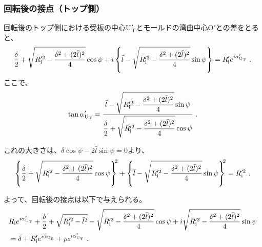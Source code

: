 \subsubsection{回転後の接点（トップ側）}
回転後のトップ側における受板の中心U$_\text T'$とモールドの湾曲中心O$'$との差をとると、
\begin{align*}
  \frac\delta2+\sqrt{R_\text i'^2-\frac{\delta^2+(2\bar l)^2}4}\cos\psi
  +i\left\{\bar l-\sqrt{R_\text i'^2-\frac{\delta^2+(2\bar l)^2}4}\sin\psi\right\}
  = R_\text i'e^{i\alpha'_{\text U_\text T}}\ .
\end{align*}
ここで、
\begin{align*}
  \tan\alpha'_{\text U_\text T}
  = \frac{\displaystyle\bar l-\sqrt{R_\text i'^2-\frac{\delta^2+(2\bar l)^2}4}\sin\psi}
         {\displaystyle\frac\delta2+\sqrt{R_\text i'^2-\frac{\delta^2+(2\bar l)^2}4}\cos\psi}\ .
\end{align*}
\begin{hosokubox}
これの大きさは、$\delta\cos\psi-2\bar l\sin\psi = 0$より、
\begin{align*}
  \left\{\frac\delta2+\sqrt{R_\text i'^2-\frac{\delta^2+(2\bar l)^2}4}\cos\psi\right\}^{\!\!2}
  +\left\{\bar l-\sqrt{R_\text i'^2-\frac{\delta^2+(2\bar l)^2}4}\sin\psi\right\}^{\!\!2}
  = R_\text i'^2\ .
\end{align*}
\end{hosokubox}
よって、回転後の接点は以下で与えられる。
\begin{align*}
  &  R_\text ie^{i\alpha'_{\text U_\text T}}
     +\frac\delta2+\sqrt{R_\text i'^2-\bar l^2}-\sqrt{R_\text i'^2-\frac{\delta^2+(2\bar l)^2}4}\cos\psi
     +i\sqrt{R_\text i'^2-\frac{\delta^2+(2\bar l)^2}4}\sin\psi\\
  &= \delta+R_\text i'e^{i\alpha_{\text U_\text B}}+\rho e^{i\alpha'_{\text U_\text T}}\ .
\end{align*}


